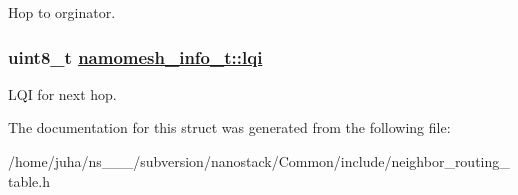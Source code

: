 Hop to orginator. \hypertarget{structnamomesh__info__t_f66923fa4678f0ce0c73ee72c3550bcd}{
\subsubsection[lqi]{\setlength{\rightskip}{0pt plus 5cm}uint8\_\-t \hyperlink{structnamomesh__info__t_f66923fa4678f0ce0c73ee72c3550bcd}{namomesh\_\-info\_\-t::lqi}}}
\label{structnamomesh__info__t_f66923fa4678f0ce0c73ee72c3550bcd}


LQI for next hop. 

The documentation for this struct was generated from the following file:\begin{CompactItemize}
\item 
/home/juha/ns\_\_\_/subversion/nanostack/Common/include/neighbor\_\-routing\_\-table.h\end{CompactItemize}
